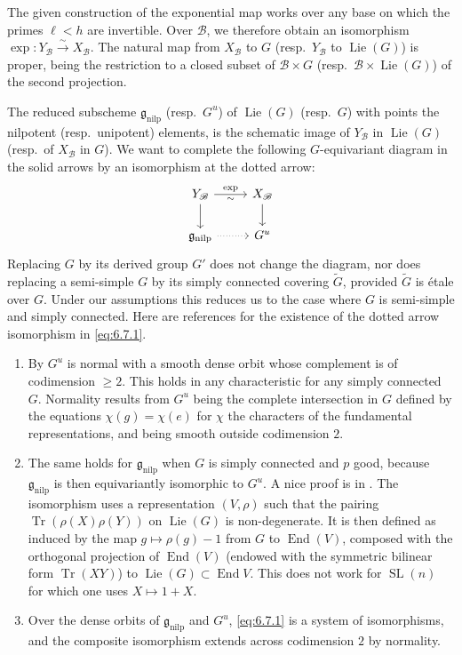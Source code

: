 \documentclass[11pt,a4paper]{article}
\theoremstyle{plain}
\theoremstyle{definition}
\DeclareMathOperator{\Tr}{Tr}
\DeclareMathOperator{\End}{End}
\DeclareMathOperator{\Lie}{Lie}
\DeclareMathOperator{\SL}{SL}
\newcommand{\nilp}{\mathrm{nilp}}
\begin{document}
The given construction of the exponential map works over any base on which the primes $\ell < h$ are invertible. Over $\mathcal{B}$, we therefore obtain an isomorphism $\exp : Y_\mathcal{B} \xrightarrow{\sim} X_\mathcal{B}$. The natural map from $X_\mathcal{B}$ to $G$ (resp.~$Y_\mathcal{B}$ to $\Lie(G)$) is proper, being the restriction to a closed subset of $\mathcal{B} \times G$ (resp.~$\mathcal{B} \times \Lie(G)$) of the second projection.

The reduced subscheme $\mathfrak{g}_\nilp$ (resp.~$G^u$) of $\Lie(G)$ (resp.~$G$) with points the nilpotent (resp.~unipotent) elements, is the schematic image of $Y_\mathcal{B}$ in $\Lie(G)$ (resp.~of $X_\mathcal{B}$ in $G$). We want to complete the following $G$-equivariant diagram in the solid arrows by an isomorphism at the dotted arrow:
\begin{equation} \label{eq:6.7.1}
\begin{tikzcd}
Y_\mathcal{B} \arrow[r, "\exp", "\sim"'] \arrow[d] & X_\mathcal{B} \arrow[d] \\
\mathfrak{g}_\nilp \arrow[r, dotted] & G^u
\end{tikzcd}
\end{equation}
Replacing $G$ by its derived group $G'$ does not change the diagram, nor does replacing a semi-simple $G$ by its simply connected covering $\tilde{G}$, provided $\tilde{G}$ is \'etale over $G$. Under our assumptions this reduces us to the case where $G$ is semi-simple and simply connected. Here are references for the existence of the dotted arrow isomorphism in \eqref{eq:6.7.1}.

\begin{enumerate}
\item[(A)] By \cite[6.11, 8.1]{St} $G^u$ is normal with a smooth dense orbit whose complement is of codimension $\geq 2$. This holds in any characteristic for any simply connected $G$. Normality results from $G^u$ being the complete intersection in $G$ defined by the equations $\chi(g) = \chi(e)$ for $\chi$ the characters of the fundamental representations, and being smooth outside codimension $2$.

\item[(B)] The same holds for $\mathfrak{g}_\nilp$ when $G$ is simply connected and $p$ good, because $\mathfrak{g}_\nilp$ is then equivariantly isomorphic to $G^u$. A nice proof is in \cite[Corollary~9.3.4]{BR}. The isomorphism uses a representation $(V, \rho)$ such that the pairing $\Tr(\rho(X)\rho(Y))$ on $\Lie(G)$ is non-degenerate. It is then defined as induced by the map $g \mapsto \rho(g) - 1$ from $G$ to $\End(V)$, composed with the orthogonal projection of $\End(V)$ (endowed with the symmetric bilinear form $\Tr(XY)$) to $\Lie(G) \subset \End V$. This does not work for $\SL(n)$ for which one uses $X \mapsto 1 + X$.

\item[(C)] Over the dense orbits of $\mathfrak{g}_\nilp$ and $G^u$, \eqref{eq:6.7.1} is a system of isomorphisms, and the composite isomorphism extends across codimension $2$ by normality.
\end{enumerate}
\end{document}
